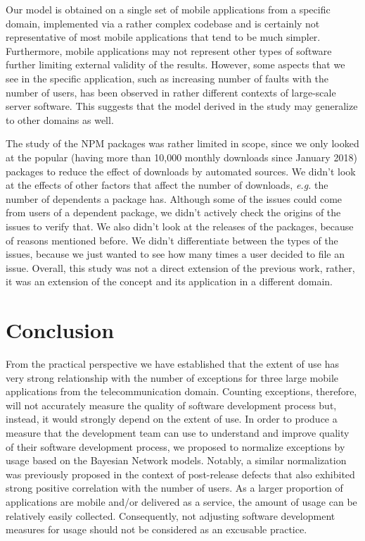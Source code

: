 \documentclass[smallextended]{svjour3}       %
\begin{document}
Our model is obtained on a single set of mobile applications 
from a specific domain, implemented via
a rather complex codebase and is certainly not representative of
most mobile applications that tend to be much simpler. Furthermore,
mobile applications  
may not represent other types of software further limiting external
validity of the results. However, some aspects that we see in the
specific application, such as increasing number of faults with the
number of users, has been observed in rather different contexts of
large-scale server software. This suggests that the model derived in
the study may generalize to other domains as well. 

The study of the NPM packages was rather limited in scope, since we
only looked at the popular (having more than 10,000 monthly downloads 
since January 2018) packages to reduce the effect of downloads by 
automated sources. We didn't look at the effects of other factors 
that affect the number of downloads, \emph{e.g.} the number of 
dependents a package has. Although some of the issues could come 
from users of a dependent package, we didn't actively check the
origins of the issues to verify that. We also didn't look at the
releases of the packages, because of reasons mentioned before.
We didn't differentiate between the types of the issues, because we 
just wanted to see how many times a user decided to file an issue.
Overall, this study was not a direct extension of the previous work,
rather, it was an extension of the concept and its application in a different domain.


\vspace{-10pt}
\section{Conclusion}\label{s:conclusion}

From the practical perspective we have established
that the extent of use has very strong relationship with the number
of exceptions for three large mobile applications from 
the telecommunication domain. Counting exceptions,
therefore, will not accurately measure the quality of software
development process but, instead, it would strongly depend on the
extent of use. In order to produce a measure that the development
team can use to understand and improve quality of their software
development process, we proposed to normalize exceptions by usage
based on the Bayesian Network models. Notably, a similar
normalization was previously proposed in the context of post-release
defects that also exhibited strong positive correlation with the
number of users.  As a larger proportion of applications are mobile
and/or delivered as a service, the amount of usage can be relatively
easily collected.  Consequently, not adjusting software
development measures for usage should not be considered as an
excusable practice.
\end{document}
